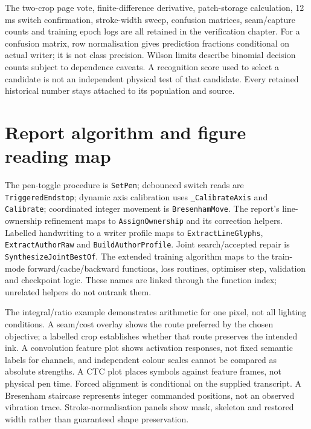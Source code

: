 The two-crop page vote, finite-difference derivative, patch-storage calculation,
12 ms switch confirmation, stroke-width sweep, confusion matrices, seam/capture
counts and training epoch logs are all retained in the verification chapter.
For a confusion matrix, row normalisation gives prediction fractions conditional
on actual writer; it is not class precision. Wilson limits describe binomial
decision counts subject to dependence caveats. A recognition score used to
select a candidate is not an independent physical test of that candidate.
Every retained historical number stays attached to its population and source.

\section{Report algorithm and figure reading map}
The pen-toggle procedure is \texttt{SetPen}; debounced switch reads are
\texttt{TriggeredEndstop}; dynamic axis calibration uses
\texttt{\_CalibrateAxis} and \texttt{Calibrate}; coordinated integer movement
is \texttt{BresenhamMove}. The report's line-ownership refinement maps to
\texttt{AssignOwnership} and its correction helpers. Labelled handwriting to
a writer profile maps to \texttt{ExtractLineGlyphs},
\texttt{ExtractAuthorRaw} and \texttt{BuildAuthorProfile}.
Joint search/accepted repair is \texttt{SynthesizeJointBestOf}. The extended
training algorithm maps to the train-mode forward/cache/backward functions,
loss routines, optimiser step, validation and checkpoint logic. These names
are linked through the function index; unrelated helpers do not outrank them.

The integral/ratio example demonstrates arithmetic for one pixel, not all
lighting conditions. A seam/cost overlay shows the route preferred by the
chosen objective; a labelled crop establishes whether that route preserves
the intended ink. A convolution feature plot shows activation responses,
not fixed semantic labels for channels, and independent colour scales cannot
be compared as absolute strengths. A CTC plot places symbols against feature
frames, not physical pen time. Forced alignment is conditional on the supplied
transcript. A Bresenham staircase represents integer commanded positions,
not an observed vibration trace. Stroke-normalisation panels show mask,
skeleton and restored width rather than guaranteed shape preservation.

